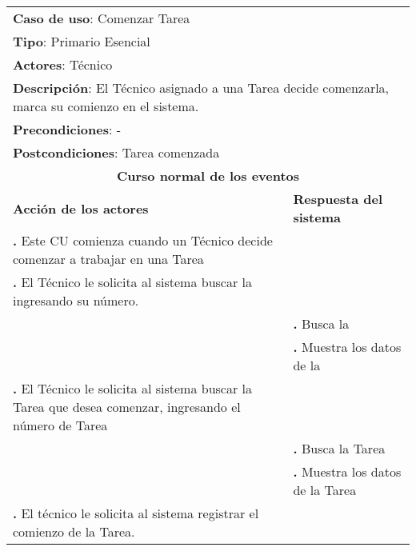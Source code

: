 \documentclass[12pt]{extarticle}
\begin{document}
    \newcommand\inc{\stepcounter{step}\textbf{\thestep. }}
    \newcommand\resetinc{\setcounter{step}{0}}
    \newcommand\raya{\noindent\rule{169mm}{0.8mm}\\}


	\begin{longtable}{ |p{8cm}|p{8cm}| }
		\hline
		\multicolumn{2}{|p{16cm}|}{\textbf{Caso de uso}: Comenzar Tarea}\\
		\multicolumn{2}{|p{16cm}|}{\textbf{Tipo}: Primario Esencial}\\
		\multicolumn{2}{|p{16cm}|}{\textbf{Actores}: Técnico}\\
		\multicolumn{2}{|p{16cm}|}{\textbf{Descripción}: El Técnico asignado a una Tarea decide comenzarla, marca su comienzo en el sistema.}\\
		\multicolumn{2}{|p{16cm}|}{\textbf{Precondiciones}: -}\\
		\multicolumn{2}{|p{16cm}|}{\textbf{Postcondiciones}: Tarea comenzada}\\
		\hline
		\multicolumn{2}{|c|}{\textbf{Curso normal de los eventos}}\\
		\hline
		\textbf{Acción de los actores} & \textbf{Respuesta del sistema}\\
		\hline

			\inc Este CU comienza cuando un Técnico decide comenzar a trabajar en una Tarea& \\
			\hline
            \inc El Técnico le solicita al sistema buscar la \OT{} ingresando su número.& \\
			\hline
            & \inc Busca la \OT{}\\
			\hline
			& \inc Muestra los datos de la \OT{}\\
			\hlineo


			\inc El Técnico le solicita al sistema buscar la Tarea que desea comenzar, ingresando el número de Tarea& \\
			\hline
			& \inc Busca la Tarea\\
			\hline
			& \inc Muestra los datos de la Tarea\\
			\hline
            \inc El técnico le solicita al sistema registrar el comienzo de la Tarea.&\\
			\hline



\end{longtable}
\end{document}
